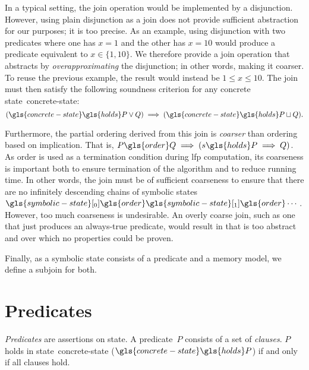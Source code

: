 In a typical setting, the join operation would be implemented by a disjunction.
However, using plain disjunction as a join does not provide sufficient abstraction for our purposes; it is too precise.
As an example, using disjunction with two predicates where one has $x=1$ and the other has $x=10$ would produce a predicate equivalent to $x\in\{1,10\}$.
We therefore provide a join operation that abstracts
by \emph{overapproximating} the disjunction; in other words, making it coarser.
To reuse the previous example, the result would instead be $1\leq x\leq 10$.
The join must then satisfy the following soundness criterion
for any concrete state~\gls{concrete-state}:
\begin{equation}
  (\gls{concrete-state}\gls{holds}P \lor Q) \implies (\gls{concrete-state}\gls{holds}P\sqcup Q).
\end{equation}

Furthermore, the partial ordering derived from this join is \emph{coarser} than ordering based on implication.
That is, $P\gls{order}Q\implies(s\gls{holds}P\implies Q)$.
As \gls{order} is used as a termination condition during \ac{lfp} computation,
its coarseness is important both to ensure termination of the algorithm and to reduce running time.
In other words, the join must be of sufficient coarseness to ensure that there are no infinitely descending chains of symbolic states $\gls{symbolic-state}[_0] \gls{order} \gls{symbolic-state}[_1] \gls{order} \dotsb$.
However, too much coarseness is undesirable.
An overly coarse join, such as one that just produces an always-true predicate,
would result in  that is too abstract and over which no properties could be proven.

Finally, as a symbolic state consists of a predicate and a memory model, we define a subjoin for both.

\section{Predicates}\label{sec:predicates}
\emph{Predicates} are assertions on state.
A predicate~$P$
consists of a set of \emph{clauses}.
$P$ holds in state~\gls{concrete-state}
($\gls{concrete-state}\gls{holds}P$) if and only if all clauses hold.


